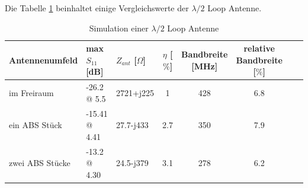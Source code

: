 
Die Tabelle \ref{tab:Evaluation_Vergeich_Loop_Antennen_Lmabda05} beinhaltet einige Vergleichswerte der $\lambda/2$ Loop Antenne.
\begin{table}[!h]
 \centering
 \begin{tabular}{p{3cm} p{3cm} l c c c c r} 
 \toprule 
 Antennenumfeld 	& max $S_{11}$ [dB]		& $Z_{ant}$ [$\Omega$] 	& $\eta$ [$\%$] & Bandbreite [MHz] & relative Bandbreite [$\%$]\\ 
 \midrule
im Freiraum 		&	-26.2 @ 5.5	& 	2721+j225	& 1		&	428 & 6.8\\ 					 		
ein ABS Stück 	& -15.41 @ 4.41 	&	27.7-j433	& 2.7	&	350 & 7.9 \\
zwei ABS Stücke & -13.2 @ 4.30 	&	24.5-j379	& 3.1	&	278 & 6.2\\
 \bottomrule
 \end{tabular}
 \caption{Simulation einer $\lambda/2$ Loop Antenne }
 \label{tab:Evaluation_Vergeich_Loop_Antennen_Lmabda05}
\end{table}

